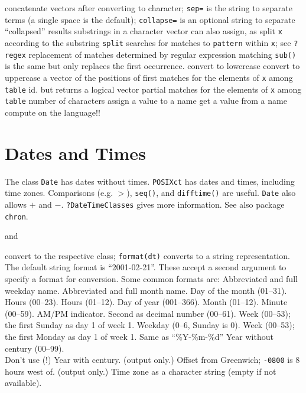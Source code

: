 	{concatenate vectors after converting to character; {\tt sep=} is the string to separate terms (a single space is the default); {\tt collapse=} is an optional string to separate ``collapsed'' results}
	{substrings in a character vector}
	{can also assign, as}
	{split {\tt x} according to the substring {\tt split}}
	{searches for matches to {\tt pattern} within {\tt x}; see {\tt ?regex}}
	{replacement of matches determined by regular expression matching {\tt sub()} is the same but only replaces the first occurrence.}
	{convert to lowercase}
	{convert to uppercase}
	{a vector of the positions of first matches for the elements of {\tt x} among {\tt table}}
	{id. but returns a logical vector}
	{partial matches for the elements of {\tt x} among {\tt table}}
	{number of characters}
	{assign a value to a name}
	{get a value from a name}
	{compute on the language!!}

\section{Dates and Times}{
The class {\tt Date} has dates without times.  {\tt POSIXct} has
dates and times, including time zones. Comparisons (e.g. $>$),
{\tt seq()}, and {\tt difftime()} are useful. {\tt Date} also allows
$+$ and $-$. {\tt ?DateTimeClasses} gives more information. See also package
{\tt chron}.}

	{and}

	{convert to the respective class; {\tt format(dt)} converts to a string representation. The default string format is ``2001-02-21''. These accept a second argument to specify a format for conversion. Some common formats are:}
	{Abbreviated and full \\weekday name.}
	{Abbreviated and full month name.}
	{Day of the month (01--31).}
	{Hours (00--23).}
	{Hours (01--12).}
	{Day of year (001--366).}
	{Month (01--12).}
	{Minute (00--59).}
	{AM/PM indicator. }
	{Second as decimal number (00--61).}
	{Week (00--53); the first Sunday as day 1 of week 1.}
	{Weekday (0--6, Sunday is 0).}
	{Week (00--53); the first Monday as day 1 of week 1.}
	{Same as ``\%Y-\%m-\%d''}
	{Year without century (00--99).\\Don't use (!)}
	{Year with century.}
	{(output only.) Offset from Greenwich; {\tt -0800} is 8 hours west of.}
	{(output only.) Time zone as a character
    string (empty if not available).}

